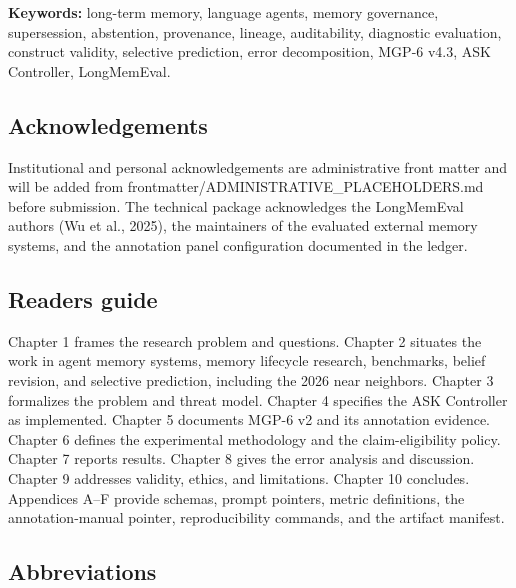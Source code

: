 \textbf{Keywords:} long-term memory, language agents, memory governance,
supersession, abstention, provenance, lineage, auditability, diagnostic
evaluation, construct validity, selective prediction, error
decomposition, MGP-6 v4.3, ASK Controller, LongMemEval.

\subsection{Acknowledgements}\label{acknowledgements}

Institutional and personal acknowledgements are administrative front
matter and will be added from
frontmatter/ADMINISTRATIVE\_PLACEHOLDERS.md before submission. The
technical package acknowledges the LongMemEval authors (Wu et al.,
2025), the maintainers of the evaluated external memory systems, and the
annotation panel configuration documented in the ledger.

\subsection{Reader\textquotesingle s guide}\label{readers-guide}

Chapter 1 frames the research problem and questions. Chapter 2 situates
the work in agent memory systems, memory lifecycle research, benchmarks,
belief revision, and selective prediction, including the 2026 near
neighbors. Chapter 3 formalizes the problem and threat model. Chapter 4
specifies the ASK Controller as implemented. Chapter 5 documents MGP-6
v2 and its annotation evidence. Chapter 6 defines the experimental
methodology and the claim-eligibility policy. Chapter 7 reports results.
Chapter 8 gives the error analysis and discussion. Chapter 9 addresses
validity, ethics, and limitations. Chapter 10 concludes. Appendices A--F
provide schemas, prompt pointers, metric definitions, the
annotation-manual pointer, reproducibility commands, and the artifact
manifest.

\subsection{Abbreviations}\label{abbreviations}

